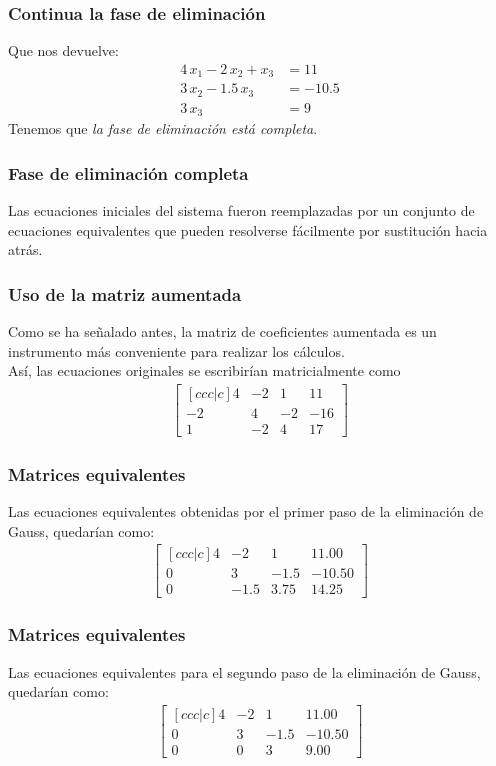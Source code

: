 \begin{frame}
\frametitle{Continua la fase de eliminación}
Que nos devuelve:
\begin{align}
4 \, x_{1} - 2 \, x_{2} + x_{3} &= 11 \label{eq:ecuacion_g} \\
3 \, x_{2} - 1.5 \, x_{3} &= -10.5 \label{eq:ecuacion_h} \\
3 \, x_{3} &= 9 \label{eq:ecuacion_i}
\end{align}
Tenemos que \emph{la fase de eliminación está completa}.
\end{frame}
\begin{frame}
\frametitle{Fase de eliminación completa}
Las ecuaciones iniciales del sistema fueron reemplazadas por un conjunto de ecuaciones equivalentes que pueden resolverse fácilmente por sustitución hacia atrás.
\end{frame}
\begin{frame}
\frametitle{Uso de la matriz aumentada}
Como se ha señalado antes, la matriz de coeficientes aumentada es un instrumento más conveniente para realizar los cálculos.
\\
\bigskip
\pause
Así, las ecuaciones originales se escribirían matricialmente como
\begin{align*}
\begin{bmatrix}[ccc|c]
4 & -2 & 1 & 11 \\
-2 & 4 & -2 & -16 \\
1 & -2 & 4 & 17
\end{bmatrix}
\end{align*}
\end{frame}
\begin{frame}
\frametitle{Matrices equivalentes}
Las ecuaciones equivalentes obtenidas por el primer paso de la eliminación de Gauss, quedarían como:
\begin{align*}
\begin{bmatrix}[ccc|c]
4 & -2 & 1 & 11.00 \\
0 & 3 & -1.5 & -10.50 \\
0 & -1.5 & 3.75 & 14.25
\end{bmatrix}
\end{align*}
\end{frame}
\begin{frame}
\frametitle{Matrices equivalentes}
Las ecuaciones equivalentes para el segundo paso de la eliminación de Gauss, quedarían como:
\begin{align*}
\begin{bmatrix}[ccc|c]
4 & -2 & 1 & 11.00 \\
0 & 3 & -1.5 & -10.50 \\
0 & 0 & 3 & 9.00    
\end{bmatrix}
\end{align*}
\end{frame}
